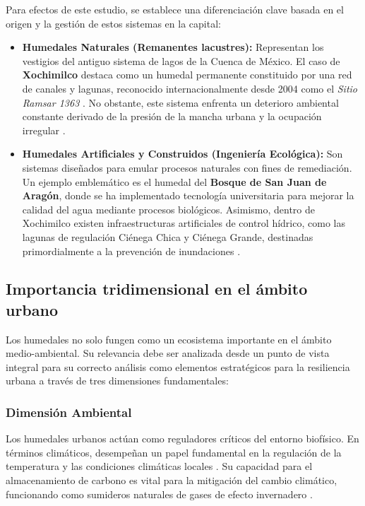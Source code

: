 Para efectos de este estudio, se establece una diferenciación clave basada en el origen y la gestión de estos sistemas en la capital:

\begin{itemize}
    \item \textbf{Humedales Naturales (Remanentes lacustres):} Representan los vestigios del antiguo sistema de lagos de la Cuenca de México.
    El caso de \textbf{Xochimilco} destaca como un humedal permanente constituido por una red de canales y lagunas, reconocido internacionalmente
    desde 2004 como el \textit{Sitio Ramsar 1363} \cite{paot2006xochimilco}. No obstante, este sistema enfrenta un deterioro ambiental constante 
    derivado de la presión de la mancha urbana y la ocupación irregular \cite{paot2006xochimilco, unam2020deterioro}.
    
    \item \textbf{Humedales Artificiales y Construidos (Ingeniería Ecológica):} Son sistemas diseñados para emular procesos naturales con fines 
    de remediación. Un ejemplo emblemático es el humedal del \textbf{Bosque de San Juan de Aragón}, donde se ha implementado tecnología universitaria 
    para mejorar la calidad del agua mediante procesos biológicos. Asimismo, dentro de Xochimilco existen infraestructuras artificiales de control hídrico,
    como las lagunas de regulación Ciénega Chica y Ciénega Grande, destinadas primordialmente a la prevención de inundaciones \cite{paot2006xochimilco}.
\end{itemize}

\subsection{Importancia tridimensional en el ámbito urbano}
Los humedales no solo fungen como un ecosistema importante en el ámbito medio-ambiental. Su relevancia debe ser analizada desde un punto de vista integral 
para su correcto análisis como elementos estratégicos para la resiliencia urbana a través de tres dimensiones fundamentales:
%
\subsubsection*{Dimensión Ambiental}
Los humedales urbanos actúan como reguladores críticos del entorno biofísico. En términos climáticos, desempeñan un papel fundamental en la regulación de
la temperatura y las condiciones climáticas locales \cite{paot2006xochimilco}. Su capacidad para el almacenamiento de carbono es vital para la mitigación del cambio climático,
funcionando como sumideros naturales de gases de efecto invernadero \cite{paot2006xochimilco}.

